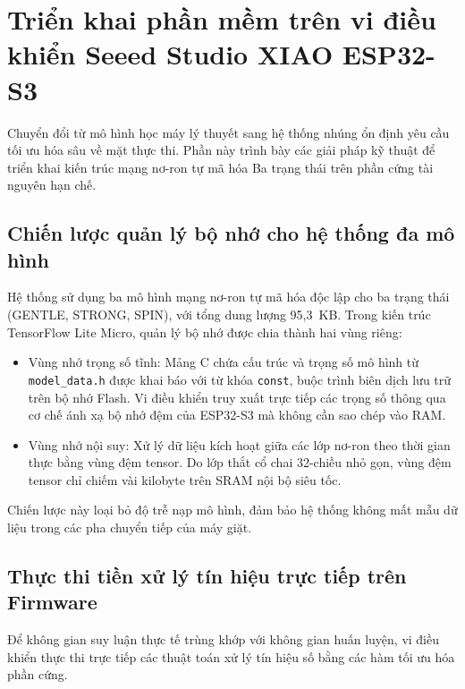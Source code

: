 

\label{chuong_4}

\section{Triển khai phần mềm trên vi điều khiển Seeed Studio XIAO ESP32-S3}

Chuyển đổi từ mô hình học máy lý thuyết sang hệ thống nhúng ổn định yêu cầu tối ưu hóa sâu về mặt thực thi. Phần này trình bày các giải pháp kỹ thuật để triển khai kiến trúc mạng nơ-ron tự mã hóa Ba trạng thái trên phần cứng tài nguyên hạn chế.

\subsection{Chiến lược quản lý bộ nhớ cho hệ thống đa mô hình}

Hệ thống sử dụng ba mô hình mạng nơ-ron tự mã hóa độc lập cho ba trạng thái (GENTLE, STRONG, SPIN), với tổng dung lượng 95,3~KB. Trong kiến trúc TensorFlow Lite Micro, quản lý bộ nhớ được chia thành hai vùng riêng:
\begin{itemize}
    \item Vùng nhớ trọng số tĩnh: Mảng C chứa cấu trúc và trọng số mô hình từ \texttt{model\_data.h} được khai báo với từ khóa \texttt{const}, buộc trình biên dịch lưu trữ trên bộ nhớ Flash. Vi điều khiển truy xuất trực tiếp các trọng số thông qua cơ chế ánh xạ bộ nhớ đệm của ESP32-S3 mà không cần sao chép vào RAM.
    \item Vùng nhớ nội suy: Xử lý dữ liệu kích hoạt giữa các lớp nơ-ron theo thời gian thực bằng vùng đệm tensor. Do lớp thắt cổ chai 32-chiều nhỏ gọn, vùng đệm tensor chỉ chiếm vài kilobyte trên SRAM nội bộ siêu tốc.
\end{itemize}
Chiến lược này loại bỏ độ trễ nạp mô hình, đảm bảo hệ thống không mất mẫu dữ liệu trong các pha chuyển tiếp của máy giặt.

\subsection{Thực thi tiền xử lý tín hiệu trực tiếp trên Firmware}

Để không gian suy luận thực tế trùng khớp với không gian huấn luyện, vi điều khiển thực thi trực tiếp các thuật toán xử lý tín hiệu số bằng các hàm tối ưu hóa phần cứng.

